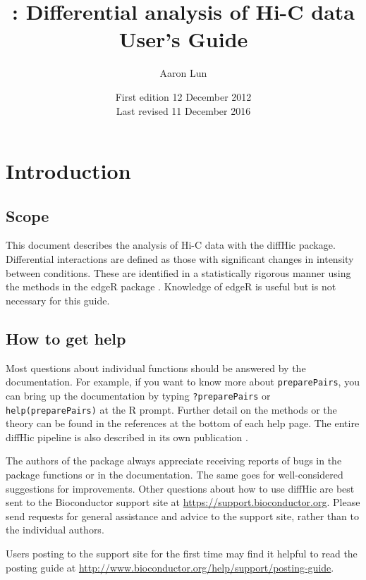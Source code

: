 \documentclass[12pt]{report}
\title{\pkgname{}: Differential analysis of Hi-C data \\ \vspace{0.2in} User's Guide}
\author{Aaron Lun}
\date{First edition 12 December 2012\\
\vspace{6pt}
Last revised 11 December 2016}
\newcommand{\edgeR}{edgeR}
\newcommand{\pkgname}{diffHic}
\newcommand{\code}[1]{{\small\texttt{#1}}}
\newcommand{\R}{\textsf{R}}
\begin{document}
\maketitle
\tableofcontents


\newpage

\chapter{Introduction}
\section{Scope}
This document describes the analysis of Hi-C data with the \pkgname{} package.
Differential interactions are defined as those with significant changes in intensity between conditions.
These are identified in a statistically rigorous manner using the methods in the \edgeR{} package \citep{edgeR}.
Knowledge of \edgeR{} is useful but is not necessary for this guide.

\section{How to get help}
Most questions about individual functions should be answered by the documentation.
For example, if you want to know more about \code{preparePairs}, you can bring up the documentation by typing \code{?preparePairs} or \code{help(preparePairs)} at the \R{} prompt.
Further detail on the methods or the theory can be found in the references at the bottom of each help page.
The entire \pkgname{} pipeline is also described in its own publication \citep{lun2015diffhic}.

The authors of the package always appreciate receiving reports of bugs in the package functions or in the documentation. 
The same goes for well-considered suggestions for improvements. 
Other questions about how to use \pkgname{} are best sent to the Bioconductor support site at \url{https://support.bioconductor.org}.
Please send requests for general assistance and advice to the support site, rather than to the individual authors. 

Users posting to the support site for the first time may find it helpful to read the posting guide at \url{http://www.bioconductor.org/help/support/posting-guide}.
\end{document}
